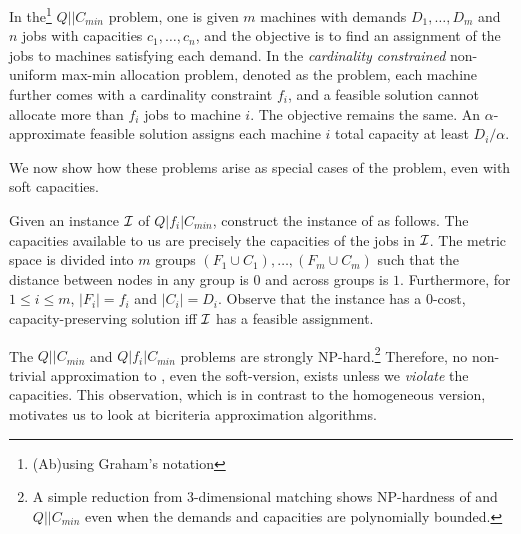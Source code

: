 \begin{definition}
In the\footnote{(Ab)using Graham's notation} $Q||C_{min}$ problem, one is given $m$ machines with demands $D_1,\ldots,D_m$ and $n$ jobs with capacities $c_1,\ldots,c_n$,
and the objective is to find an assignment of the jobs to machines satisfying each demand.
In the {\em cardinality constrained}  non-uniform max-min allocation problem, denoted as the \cckp problem, each machine further comes with a cardinality constraint $f_i$, and a feasible solution cannot allocate more than $f_i$ jobs to machine $i$. The objective remains the same. An $\alpha$-approximate feasible solution assigns each machine $i$  total capacity at least $ D_i/\alpha$.
\end{definition}
\noindent
We now show how these problems arise as special cases
of the \mckc problem, even with soft capacities.
\begin{remark}\label{frem:cckp}
	Given an instance ${\cal I}$ of $Q|f_i|C_{min}$, construct the instance of \mckc as follows. The capacities available to us are precisely the capacities of the jobs in ${\cal I}$.
	The metric space is divided into $m$ groups $(F_1\cup C_1),\ldots,(F_m\cup C_m)$ such that the distance between nodes in any group is $0$ and across groups is $1$.
	Furthermore, for $1\leq i\leq m$, $|F_i| = f_i$ and $|C_i| = D_i$. Observe that the \mckc instance has a $0$-cost, capacity-preserving solution iff ${\cal I}$ has a feasible assignment.
\end{remark}
The $Q||C_{min}$ and $Q|f_i|C_{min}$ problems are strongly NP-hard.\footnote{A simple reduction from 3-dimensional matching shows NP-hardness of \cckp and $Q || C_{min}$ even when the demands and capacities are polynomially bounded.} Therefore, no non-trivial approximation to \mckc, even the soft-version, exists unless we {\em violate} the capacities.
This observation, which is in contrast to the homogeneous version, motivates us to look at bicriteria approximation algorithms.
%
%
%
%
%
